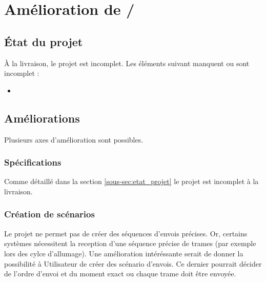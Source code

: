 %
%
\newpage %
\section{Amélioration de {\nomApplication}/{\nomLogiciel}}

\subsection{État du projet} {\label{sous-sec:etat_projet}}
À la livraison, le projet est incomplet. Les éléments suivant manquent ou sont incomplet :
\begin{itemize}
    \item 
\end{itemize}

\subsection{Améliorations}
Plusieurs axes d'amélioration sont possibles.

\subsubsection{Spécifications}
Comme détaillé dans la section {\ref{sous-sec:etat_projet}} le projet est incomplet à la livraison.

\subsubsection{Création de scénarios}
Le projet {\projectName} ne permet pas de créer des séquences d'envois précises. Or, certains systèmes nécessitent la reception d'une séquence précise de trames (par exemple lors des cylce d'allumage). Une amélioration intéréssante serait de donner la possibilité à Utilisateur de créer des scénario d'envois. Ce dernier pourrait décider de l'ordre d'envoi et du moment exact ou chaque trame doit être envoyée.
